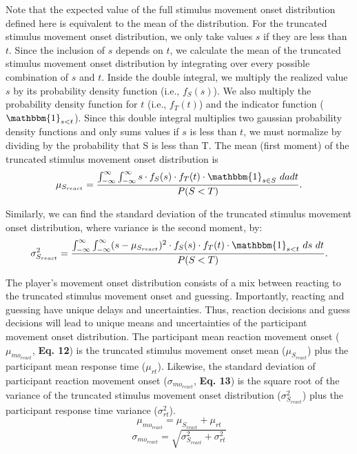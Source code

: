 \documentclass[12pt]{article}
\newcommand\boldblue[1]{\textcolor{mydarkblue}{\textbf{#1}}}
\begin{document}
Note that the expected value of the full stimulus movement onset distribution defined here is equivalent to the mean of the distribution. For the truncated stimulus movement onset distribution, we only take values $s$ if they are less than $t$. Since the inclusion of $s$ depends on $t$, we calculate the mean of the truncated stimulus movement onset distribution by integrating over every possible combination of $s$ and $t$. Inside the double integral, we multiply the realized value $s$ by its probability density function (i.e., $f_{S}(s)$). We also multiply the probability density function for $t$ (i.e., $f_{T}(t)$) and the indicator function ($\mathbbm{1}_{s<t}$). Since this double integral multiplies two gaussian probability density functions and only sums values if $s$ is less than $t$, we must normalize by dividing by the probability that S is less than T. The mean (first moment) of the truncated stimulus movement onset distribution is
\begin{equation}
    \mu_{S_{react}} = \dfrac{\int_{-\infty}^{\infty}  \int_{-\infty}^{\infty} s \cdot f_{S}(s) \cdot f_{T}(t) \cdot \mathbbm{1}_{s \in S} \ dadt} {P(S<T)}.
\end{equation}

Similarly, we can find the standard deviation of the truncated stimulus movement onset distribution, where variance is the second moment, by:
%
\begin{equation}
    \sigma^2_{S_{react}} = \dfrac{\int_{-\infty}^{\infty}  \int_{-\infty}^{\infty} (s - \mu_{S_{react}})^2 \cdot f_{S}(s) \cdot f_{T}(t) \cdot \mathbbm{1}_{s<t} \ ds \ dt}{P(S<T)}.
\end{equation}

The player’s movement onset distribution consists of a mix between reacting to the truncated stimulus movement onset and guessing. Importantly, reacting and guessing have unique delays and uncertainties. Thus, reaction decisions and guess decisions will lead to unique means and uncertainties of the participant movement onset distribution.
The participant mean reaction movement onset ($\mu_{mo_{react}}$, \boldblue{Eq. 12}) is the truncated stimulus movement onset mean ($\mu_{S_{react}}$) plus the participant mean response time ($\mu_{rt}$). Likewise, the standard deviation of participant reaction movement onset ($\sigma_{mo_{react}}$, \boldblue{Eq. 13}) is the square root of the variance of the truncated stimulus movement onset distribution ($\sigma_{S_{react}}^2$) plus the participant response time variance ($\sigma_{rt}^2$).
\begin{equation}
    \mu_{mo_{react}} = \mu_{S_{react}} + \mu_{rt}
\end{equation}
\begin{equation}
    \sigma_{mo_{react}} = \sqrt{\sigma_{S_{react}}^2 + \sigma_{rt}^2}
\end{equation}
\end{document}
